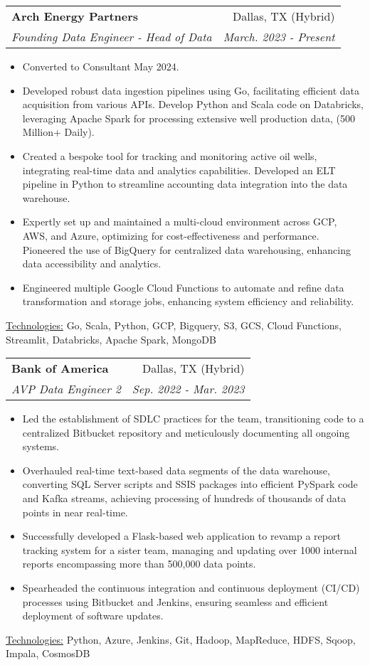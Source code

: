 \documentclass[11pt, a4paper]{article}
\makeatletter
\newcommand{\resumeItem}[1]{%
  \item\small{
    #1
  }
}
\newcommand{\resumeSubheading}[4]{
  \vspace{8pt}\item%
    \begin{tabular*}{0.97\textwidth}[t]{l@{\extracolsep{\fill}}r}
      \textbf{#1} & #2 \\
      \textit{\small#3} & \textit{\small #4} \\
    \end{tabular*}\vspace{-5pt}
}
\newcommand{\resumeItemListStart}{\begin{itemize}}
\newcommand{\resumeItemListEnd}{\end{itemize}\vspace{-5pt}}
\newcommand{\resumeTech}[2]{
 \underline{#1:} #2
}
\makeatother
\begin{document}
    \resumeSubheading
      {Arch Energy Partners}{Dallas, TX (Hybrid)}
      {Founding Data Engineer - Head of Data }{March. 2023 - Present}
      \resumeItemListStart
      \resumeItem{Converted to Consultant May 2024.}
      \resumeItem{Developed robust data ingestion pipelines using Go, facilitating efficient data acquisition from various APIs. Develop Python and Scala code on Databricks, leveraging Apache Spark for processing extensive well production data, (500 Million+ Daily).}
      \resumeItem{Created a bespoke tool for tracking and monitoring active oil wells, integrating real-time data and analytics capabilities. Developed an ELT pipeline in Python to streamline accounting data integration into the data warehouse.}
      \resumeItem{Expertly set up and maintained a multi-cloud environment across GCP, AWS, and Azure, optimizing for cost-effectiveness and performance. Pioneered the use of BigQuery for centralized data warehousing, enhancing data accessibility and analytics.}
      \resumeItem{Engineered multiple Google Cloud Functions to automate and refine data transformation and storage jobs, enhancing system efficiency and reliability.}
\resumeItemListEnd
\resumeTech{Technologies}{Go, Scala, Python, GCP, Bigquery, S3, GCS, Cloud Functions, Streamlit, Databricks, Apache Spark, MongoDB }



\resumeSubheading
      {Bank of America}{Dallas, TX (Hybrid)}
      {AVP Data Engineer 2}{Sep. 2022 - Mar. 2023}
      \resumeItemListStart
      \resumeItem{Led the establishment of SDLC practices for the team, transitioning code to a centralized Bitbucket repository and meticulously documenting all ongoing systems.}
      \resumeItem{Overhauled real-time text-based data segments of the data warehouse, converting SQL Server scripts and SSIS packages into efficient PySpark code and Kafka streams, achieving processing of hundreds of thousands of data points in near real-time.}
      \resumeItem{Successfully developed a Flask-based web application to revamp a report tracking system for a sister team, managing and updating over 1000 internal reports encompassing more than 500,000 data points.}
      \resumeItem{Spearheaded the continuous integration and continuous deployment (CI/CD) processes using Bitbucket and Jenkins, ensuring seamless and efficient deployment of software updates.}
\resumeItemListEnd
\resumeTech{Technologies}{Python, Azure, Jenkins, Git, Hadoop, MapReduce, HDFS, Sqoop, Impala, CosmosDB}
\end{document}
